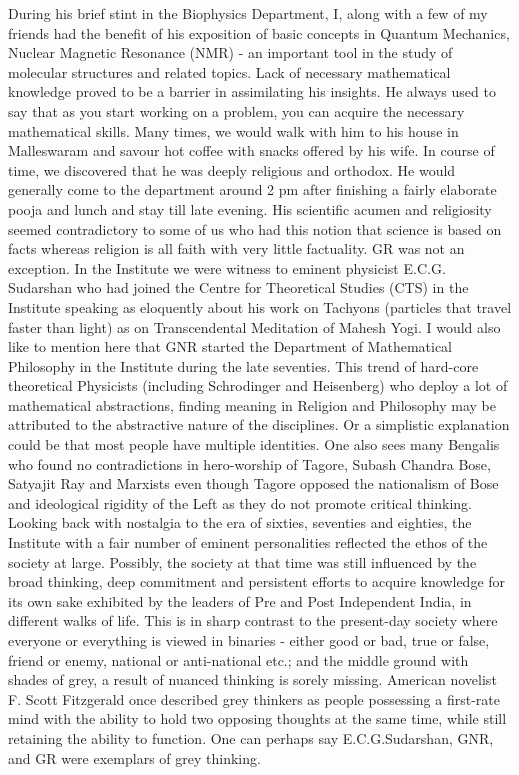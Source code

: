 During his brief stint in the Biophysics Department, I, along with a few of my friends had the benefit of his exposition of basic concepts in Quantum Mechanics, Nuclear Magnetic Resonance (NMR) - an important tool in the study of molecular structures and related topics. Lack of necessary mathematical knowledge proved to be a barrier in assimilating his insights. He always used to say that as you start working on a problem, you can acquire the necessary mathematical skills. Many times, we would walk with him to his house in Malleswaram and savour hot coffee with snacks offered by his wife. In course of time, we discovered that he was deeply religious and orthodox. He would generally come to the department around 2 pm after finishing a fairly elaborate pooja and lunch and stay till late evening. His scientific acumen and religiosity seemed contradictory to some of us who had this notion that science is based on facts whereas religion is all faith with very little factuality. GR was not an exception. In the Institute we were witness to eminent physicist E.C.G. Sudarshan who had joined the Centre for Theoretical Studies (CTS) in the Institute speaking as eloquently about his work on Tachyons (particles that travel faster than light) as on Transcendental Meditation of Mahesh Yogi.  I would also like to mention here that GNR started the Department of Mathematical Philosophy in the Institute during the late seventies. This trend of hard-core theoretical Physicists (including Schrodinger and Heisenberg) who deploy a lot of mathematical abstractions, finding meaning in Religion and Philosophy may be attributed to the abstractive nature of the disciplines. Or a simplistic explanation could be that most people have multiple identities. One also sees many Bengalis who found no contradictions in hero-worship of Tagore, Subash Chandra Bose, Satyajit Ray and Marxists even though Tagore opposed the nationalism of Bose and ideological rigidity of the Left as they do not promote critical thinking. Looking back with nostalgia to the era of sixties, seventies and eighties, the Institute with a fair number of eminent personalities reflected the ethos of the society at large. Possibly, the society at that time was still influenced by the broad thinking, deep commitment and persistent efforts to acquire knowledge for its own sake exhibited by the leaders of Pre and Post Independent India, in different walks of life. This is in sharp contrast to the present-day society where everyone or everything is viewed in binaries - either good or bad, true or false, friend or enemy, national or anti-national etc.; and the middle ground with shades of grey, a result of nuanced thinking is sorely missing.  American novelist F. Scott Fitzgerald once described grey thinkers as people possessing a first-rate mind with the ability to hold two opposing thoughts at the same time, while still retaining the ability to function. One can perhaps say E.C.G.Sudarshan, GNR, and GR were exemplars of grey thinking.

